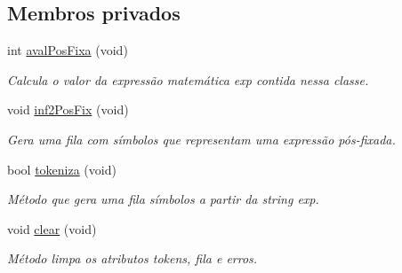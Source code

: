 \subsection*{Membros privados}
\begin{DoxyCompactItemize}
\item 
int \hyperlink{class_expressao_a129eb361b81c38d02ee248a921677ddf}{aval\-Pos\-Fixa} (void)
\begin{DoxyCompactList}\small\item\em Calcula o valor da expressão matemática exp contida nessa classe. \end{DoxyCompactList}\item 
void \hyperlink{class_expressao_a78db9b198287567d82fc98d3684af9cc}{inf2\-Pos\-Fix} (void)
\begin{DoxyCompactList}\small\item\em Gera uma fila com símbolos que representam uma expressão pós-\/fixada. \end{DoxyCompactList}\item 
bool \hyperlink{class_expressao_a54af4fb6157b2bff0da85514ed4fd83b}{tokeniza} (void)
\begin{DoxyCompactList}\small\item\em Método que gera uma fila símbolos a partir da string exp. \end{DoxyCompactList}\item 
\hypertarget{class_expressao_a342b3aec1550af38a209e750383c6fdf}{void \hyperlink{class_expressao_a342b3aec1550af38a209e750383c6fdf}{clear} (void)}\label{class_expressao_a342b3aec1550af38a209e750383c6fdf}

\begin{DoxyCompactList}\small\item\em Método limpa os atributos tokens, fila e erros. \end{DoxyCompactList}\end{DoxyCompactItemize}

